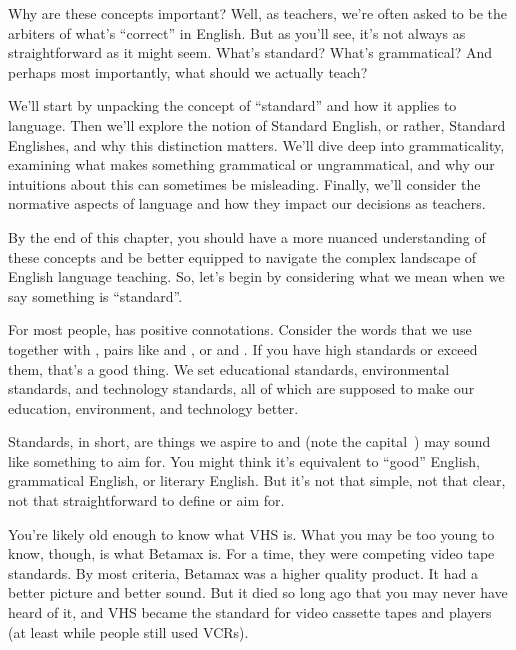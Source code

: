 Why are these concepts important? Well, as teachers, we're often asked to be the arbiters of what's \enquote{correct} in English. But as you'll see, it's not always as straightforward as it might seem. What's standard? What's grammatical? And perhaps most importantly, what should we actually teach?

We'll start by unpacking the concept of \enquote{standard} and how it applies to language. Then we'll explore the notion of Standard English, or rather, Standard Englishes, and why this distinction matters. We'll dive deep into grammaticality, examining what makes something grammatical or ungrammatical, and why our intuitions about this can sometimes be misleading. Finally, we'll consider the normative aspects of language and how they impact our decisions as teachers.

By the end of this chapter, you should have a more nuanced understanding of these concepts and be better equipped to navigate the complex landscape of English language teaching. So, let's begin by considering what we mean when we say something is \enquote{standard}.

For most people,  has positive connotations. Consider the words that we use together with , pairs like  and , or  and . If you have high standards or exceed them, that's a good thing. We set educational standards, environmental standards, and technology standards, all of which are supposed to make our education, environment, and technology better.

Standards, in short, are things we aspire to and  (note the capital~) may sound like something to aim for. You might think it's equivalent to \enquote{good} English, grammatical English, or literary English. But it's not that simple, not that clear, not that straightforward to define or aim for.

You're likely old enough to know what VHS is. What you may be too young to know, though, is what Betamax is. For a time, they were competing video tape standards. By most criteria, Betamax was a higher quality product. It had a better picture and better sound. But it died so long ago that you may never have heard of it, and VHS became the standard for video cassette tapes and players (at least while people still used VCRs).

